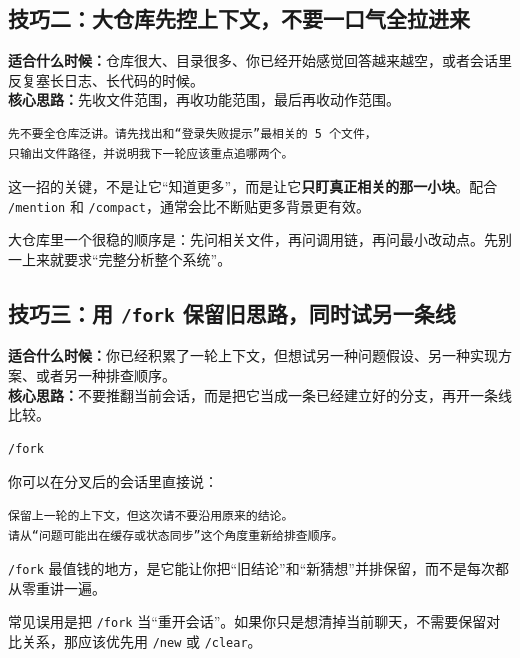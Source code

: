 \documentclass[UTF8,a4paper,12pt]{ctexart}
\begin{document}
\subsection{技巧二：大仓库先控上下文，不要一口气全拉进来}

\textbf{适合什么时候：}仓库很大、目录很多、你已经开始感觉回答越来越空，或者会话里反复塞长日志、长代码的时候。\\
\textbf{核心思路：}先收文件范围，再收功能范围，最后再收动作范围。

\begin{lstlisting}[style=prompt]
先不要全仓库泛讲。请先找出和“登录失败提示”最相关的 5 个文件，
只输出文件路径，并说明我下一轮应该重点追哪两个。
\end{lstlisting}

这一招的关键，不是让它“知道更多”，而是让它\textbf{只盯真正相关的那一小块}。配合 \texttt{/mention} 和 \texttt{/compact}，通常会比不断贴更多背景更有效。

\begin{tipbox}
大仓库里一个很稳的顺序是：先问相关文件，再问调用链，再问最小改动点。先别一上来就要求“完整分析整个系统”。
\end{tipbox}

\subsection{技巧三：用 \texttt{/fork} 保留旧思路，同时试另一条线}

\textbf{适合什么时候：}你已经积累了一轮上下文，但想试另一种问题假设、另一种实现方案、或者另一种排查顺序。\\
\textbf{核心思路：}不要推翻当前会话，而是把它当成一条已经建立好的分支，再开一条线比较。

\begin{lstlisting}[style=cli]
/fork
\end{lstlisting}

你可以在分叉后的会话里直接说：

\begin{lstlisting}[style=prompt]
保留上一轮的上下文，但这次请不要沿用原来的结论。
请从“问题可能出在缓存或状态同步”这个角度重新给排查顺序。
\end{lstlisting}

\texttt{/fork} 最值钱的地方，是它能让你把“旧结论”和“新猜想”并排保留，而不是每次都从零重讲一遍。

\begin{warnbox}
常见误用是把 \texttt{/fork} 当“重开会话”。如果你只是想清掉当前聊天，不需要保留对比关系，那应该优先用 \texttt{/new} 或 \texttt{/clear}。
\end{warnbox}
\end{document}
